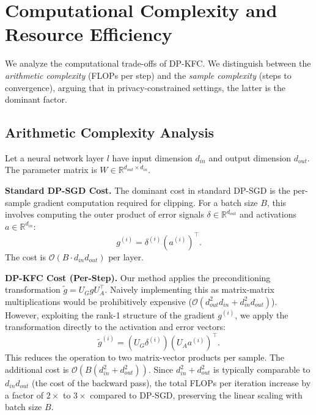 \documentclass{article}
\theoremstyle{plain}
\theoremstyle{definition}
\theoremstyle{remark}
\begin{document}
\clearpage

\section{Computational Complexity and Resource Efficiency}
\label{app:complexity}

We analyze the computational trade-offs of DP-KFC. We distinguish between the \textit{arithmetic complexity} (FLOPs per step) and the \textit{sample complexity} (steps to convergence), arguing that in privacy-constrained settings, the latter is the dominant factor.

\subsection{Arithmetic Complexity Analysis}

Let a neural network layer $l$ have input dimension $d_{in}$ and output dimension $d_{out}$. The parameter matrix is $W \in \mathbb{R}^{d_{out} \times d_{in}}$.

\textbf{Standard DP-SGD Cost.}
The dominant cost in standard DP-SGD is the per-sample gradient computation required for clipping. For a batch size $B$, this involves computing the outer product of error signals $\delta \in \mathbb{R}^{d_{out}}$ and activations $a \in \mathbb{R}^{d_{in}}$:
\begin{equation}
    g^{(i)} = \delta^{(i)} (a^{(i)})^\top.
\end{equation}
The cost is $\mathcal{O}(B \cdot d_{in} d_{out})$ per layer.

\textbf{DP-KFC Cost (Per-Step).}
Our method applies the preconditioning transformation $\tilde{g} = U_G g U_A^\top$. Naively implementing this as matrix-matrix multiplications would be prohibitively expensive ($\mathcal{O}(d_{out}^2 d_{in} + d_{in}^2 d_{out})$).
However, exploiting the rank-1 structure of the gradient $g^{(i)}$, we apply the transformation directly to the activation and error vectors:
\begin{equation}
    \tilde{g}^{(i)} = (U_G \delta^{(i)}) (U_A a^{(i)})^\top.
\end{equation}
This reduces the operation to two matrix-vector products per sample. The additional cost is $\mathcal{O}(B(d_{in}^2 + d_{out}^2))$.
Since $d_{in}^2 + d_{out}^2$ is typically comparable to $d_{in} d_{out}$ (the cost of the backward pass), the total FLOPs per iteration increase by a factor of $2\times$ to $3\times$ compared to DP-SGD, preserving the linear scaling with batch size $B$.
\end{document}

